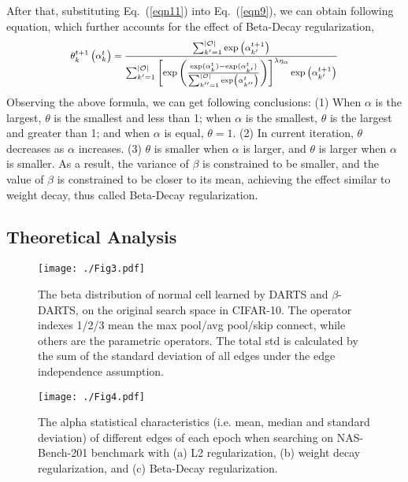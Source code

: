 \documentclass[10pt,twocolumn,letterpaper]{article}
\begin{document}
After that, substituting Eq.~(\ref{eqn11}) into Eq.~(\ref{eqn9}), we can obtain following equation, which further accounts for the effect of Beta-Decay regularization,
\begin{equation} \label{eqn12}
\footnotesize
  \begin{split}
    \theta_{k}^{t+1}\left(\alpha_k^t \right)=\frac{\sum_{k^{\prime}=1}^{\left | \mathcal{O}\right |} \exp \left(\alpha_{k^{\prime}}^{t+1}\right)}{\sum_{k^{\prime}=1}^{\left | \mathcal{O}\right |} \left[\exp \left(\frac{\exp(\alpha_{k}^{t})-\exp(\alpha_{k^{\prime}}^{t})}{\sum_{k^{\prime\prime}=1}^{\left | \mathcal{O}\right |} \exp \left(\alpha_{k^{\prime\prime}}^{t}\right)}\right)\right]^{\lambda \eta_{\alpha}} \exp \left(\alpha_{k^{\prime}}^{t+1}\right)}
  \end{split}
  \vspace{-6pt}
\end{equation}
Observing the above formula, we can get following conclusions: (1) When $\alpha$ is the largest, $\theta$ is the smallest and less than 1; when $\alpha$ is the smallest, $\theta$ is the largest and greater than 1; and when $\alpha$ is equal, $\theta=1$. (2) In current iteration, $\theta$ decreases as $\alpha$ increases. (3) $\theta$ is smaller when $\alpha$ is larger, and $\theta$ is larger when $\alpha$ is smaller. As a result, the variance of $\beta$ is constrained to be smaller, and the value of $\beta$ is constrained to be closer to its mean, achieving the effect similar to weight decay, thus called Beta-Decay regularization.

\subsection{Theoretical Analysis} \label{sec:Theo}
  \begin{figure}[t] 
	\centering
\texttt{[image: ./Fig3.pdf]}
\vspace{-8pt}
	\caption{The beta distribution of normal cell learned by DARTS and $\beta$-DARTS, on the original search space in CIFAR-10. The operator indexes 1/2/3 mean the max pool/avg pool/skip connect, while others are the parametric operators. The total std is calculated by the sum of the standard deviation of all edges under the edge independence assumption.} \label{fig:4}
	\vspace{-10pt}	
\end{figure}

\begin{figure*}[t] 
	\centering
\texttt{[image: ./Fig4.pdf]}
\vspace{-12pt}
	\caption{The alpha statistical characteristics (i.e. mean, median and standard deviation) of different edges of each epoch when searching on NAS-Bench-201 benchmark with (a) L2 regularization, (b) weight decay regularization, and (c) Beta-Decay regularization.}
	\label{fig:2}
	\vspace{-10pt}	
\end{figure*}
\end{document}

